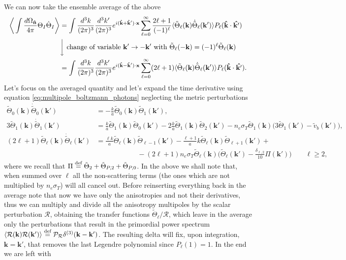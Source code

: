 We can now take the ensemble average of the above
\begin{align*}
    \bigg\langle\int\frac{d\Omega_{\mathbf{\hat{n}}}}{4\pi}\Theta_I\dot \Theta_I\bigg\rangle&=\int\frac{d^3k}{(2\pi)^3}\frac{d^3k'}{(2\pi)^3}e^{i(\mathbf{\hat{k}}+\mathbf{\hat{k}}')\cdot\mathbf{x}}\sum_{\ell=0}^{\infty}\frac{2\ell+1}{(-1)^{\ell}}\langle\tilde\Theta_\ell(\mathbf{k})\dot{\tilde\Theta}_{\ell}(\mathbf{k}')\rangle P_\ell(\mathbf{\hat{k}}\cdot\mathbf{\hat{k'}})\\
    &\bigg\downarrow\ \text{change of variable }\mathbf{k}'\rightarrow-\mathbf{k}'\text{ with } \tilde\Theta_\ell(-\mathbf{k})=(-1)^\ell \tilde\Theta_\ell(\mathbf{k})\\
    &=\int\frac{d^3k}{(2\pi)^3}\frac{d^3k'}{(2\pi)^3}e^{i(\mathbf{\hat{k}}-\mathbf{\hat{k}}')\cdot\mathbf{x}}\sum_{\ell=0}^{\infty}(2\ell+1)\langle\tilde\Theta_\ell(\mathbf{k})\dot{\tilde\Theta}_{\ell}(\mathbf{k}')\rangle P_\ell(\mathbf{\hat{k}}\cdot\mathbf{\hat{k'}}).
\end{align*}
Let's focus on the averaged quantity and let's expand the time derivative using equation \eqref{eq:multipole_boltzmann_photons} neglecting the metric perturbations
\begin{align*}
    \tilde\Theta_0(\mathbf{k})\dot{\tilde\Theta}_{0}(\mathbf{k}')&=-\frac{k}{a}\tilde\Theta_0(\mathbf{k})\tilde\Theta_1(\mathbf{k}'),&&\\
    3\tilde\Theta_1(\mathbf{k})\dot{\tilde\Theta}_{1}(\mathbf{k}')&=\frac{k}{a}\tilde\Theta_1(\mathbf{k})\tilde\Theta_0(\mathbf{k}')-2\frac{k}{a}\tilde\Theta_1(\mathbf{k})\tilde\Theta_2(\mathbf{k}')-n_e\sigma_T\tilde\Theta_1(\mathbf{k})\bigg( 3\tilde\Theta_1(\mathbf{k}')-\tilde v_b(\mathbf{k}') \bigg),&&\\
    (2\ell+1)\tilde\Theta_\ell(\mathbf{k})\dot{\tilde\Theta}_{\ell}(\mathbf{k}')&=\frac{\ell k}{a}\tilde\Theta_\ell(\mathbf{k})\tilde\Theta_{\ell-1}(\mathbf{k}')-\frac{\ell+1}{a}k\tilde\Theta_\ell(\mathbf{k})\tilde\Theta_{\ell+1}(\mathbf{k}')+\\&\qquad\qquad\qquad-(2\ell+1)n_e\sigma_T\tilde\Theta_\ell(\mathbf{k})\bigg(\tilde\Theta_\ell(\mathbf{k}')-\frac{\delta_{\ell,2}}{10}\Pi(\mathbf{k}')\bigg)\qquad\ell\geq2,&&
\end{align*}
where we recall that $\Pi\stackrel{\text{def}}{=}\tilde\Theta_2+\tilde\Theta_{P,2}+\tilde\Theta_{P,0}$. In the above we shall note that, when summed over $\ell$ all the non-scattering terms (the ones which are not multiplied by $n_e\sigma_T$) will all cancel out. Before reinserting everything back in the average note that now we have only the anisotropies and not their derivatives, thus we can multiply and divide all the anisotropy multipoles by the scalar perturbation $\mathcal{R}$, obtaining the transfer functions $\tilde\Theta_\ell/\mathcal{R}$, which leave in the average only the perturbations that result in the primordial power spectrum $\langle\mathcal{R}(\mathbf{k}) \mathcal{R}(\mathbf{k}') \rangle\stackrel{\text{def}}{=}\mathcal{P}_\mathcal{R} \delta^{(3)}(\mathbf{k}-\mathbf{k'})$. The resulting delta will fix, upon integration, $\mathbf{k}=\mathbf{k'}$, that removes the last Legendre polynomial since $P_\ell(1)=1$. In the end we are left with
